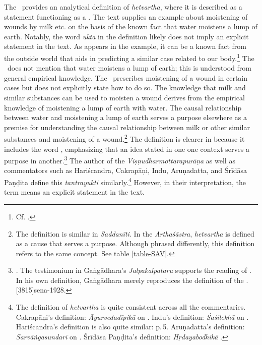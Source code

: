 The \SS\ provides an analytical definition of \emph{hetvartha}, 
where it is described as a statement functioning as a . 
The text supplies an example about moistening of wounds by milk etc. 
on the basis of the known fact that water moistens a lump of earth. 
Notably, the word \emph{ukta} in the definition 
likely does not imply an explicit statement in the text. 
As appears in the example, it can be a known fact from the outside world 
that aids in predicting a similar case related to our body.\footnote{%
	Cf.  
	.} 
The \SS\ does not mention that water moistens a lump of earth; 
this is understood from general empirical knowledge. 
The \SS\ prescribes moistening of a wound in certain cases 
but does not explicitly state how to do so. 
The knowledge that milk and similar substances 
can be used to moisten a wound derives 
from the empirical knowledge of moistening a lump of earth with water. 
The causal relationship between water and moistening a lump of earth 
serves a purpose elsewhere as a premise 
for understanding the causal relationship 
between milk or other similar substances 
and moistening of a wound.\footnote{%
	The definition is similar in \emph{Saddanīti}. 
	In the \emph{Arthaśāstra}, \emph{hetvartha} is defined 
	as a cause that serves a purpose. 
	Although phrased differently, 
	this definition refers to the same concept. 
	See table \ref{table-SAV}.} 
The definition is clearer in  
because it includes the word , 
emphasizing that an idea stated in one one context 
serves a purpose in another.\footnote{	.
		The testimonium in Gaṅgādhara's \emph{Jalpakalpataru} 
		supports the reading of \Su{}{}. 
		In his own definition, Gaṅgādhara merely reproduces the definition of the \SS. 
		{sena-1928}.} 
The author of the \emph{Viṣṇudharmottarapurāṇa} as well as 
commentators such as Hariścandra, Cakrapāṇi, Indu, Aruṇadatta, and Śrīdāsa Paṇḍita 
define this \emph{tantrayukti} similarly.\footnote{%
	The definition of \emph{hetvartha} is quite consistent
	across all the commentaries.
	Cakrapāṇi's definition:  
		\emph{Āyurvedadīpikā} on .
	Indu's definition: 
		\emph{Śaśilekhā} on .
	Hariścandra's definition is also quite similar: 
		  p.\,5.
	Aruṇadatta's definition: 
		\emph{Sarvāṅgasundarī} on .
	Śrīdāsa Paṇḍita's definition: 
		\emph{Hṛdayabodhikā} \parencite[2]{muss-1940}.
		} 
However, in their interpretation, the term  
means an explicit statement in the text. 

